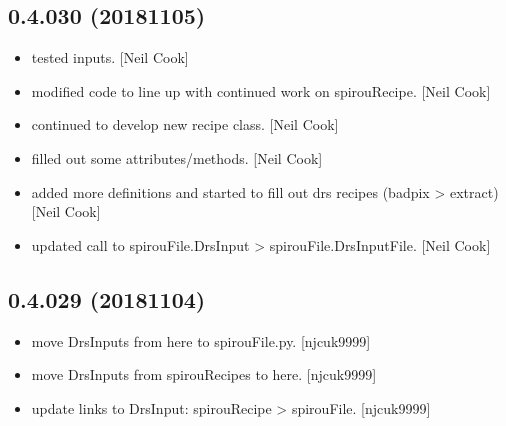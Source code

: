 \documentclass[a4paper,10pt,english]{report}
\begin{document}
\subsection{0.4.030 (2018\sphinxhyphen{}11\sphinxhyphen{}05)}
\label{\detokenize{misc/changelog:id289}}\begin{itemize}
\item {} 
 \sphinxhyphen{} tested  inputs. {[}Neil Cook{]}

\item {} 
 \sphinxhyphen{} modified code to line up with continued work on
spirouRecipe. {[}Neil Cook{]}

\item {} 
 \sphinxhyphen{} continued to develop new recipe class. {[}Neil Cook{]}

\item {} 
 \sphinxhyphen{} filled out some attributes/methods. {[}Neil Cook{]}

\item {} 
 \sphinxhyphen{} added more definitions and started to fill out drs
recipes (badpix \textendash{}\textgreater{} extract) {[}Neil Cook{]}

\item {} 
 \sphinxhyphen{} updated call to spirouFile.DrsInput \textendash{}\textgreater{}
spirouFile.DrsInputFile. {[}Neil Cook{]}

\end{itemize}


\subsection{0.4.029 (2018\sphinxhyphen{}11\sphinxhyphen{}04)}
\label{\detokenize{misc/changelog:id290}}\begin{itemize}
\item {} 
 \sphinxhyphen{} move DrsInputs from here to spirouFile.py.
{[}njcuk9999{]}

\item {} 
 \sphinxhyphen{} move DrsInputs from spirouRecipes to here. {[}njcuk9999{]}

\item {} 
 \sphinxhyphen{} update links to DrsInput: spirouRecipe \textendash{}\textgreater{}
spirouFile. {[}njcuk9999{]}

\end{itemize}
\end{document}
